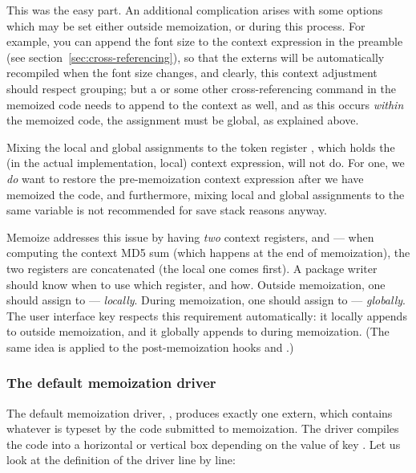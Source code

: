 \documentclass[a4paper,11pt]{article}
\begin{document}
This was the easy part.  An additional complication arises with some options
which may be set either outside memoization, or during this process.  For
example, you can append the font size to the context expression in the preamble
(see section~\ref{sec:cross-referencing}), so that the externs will be
automatically recompiled when the font size changes, and clearly, this context
adjustment should respect  grouping; but a  or some other
cross-referencing command in the memoized code needs to append to the context
as well, and as this  occurs \emph{within} the memoized code, the
assignment must be global, as explained above.

Mixing the local and global assignments to the token register
, which holds the (in the actual implementation, local)
context expression, will not do.  For one, we \emph{do} want to restore the
pre-memoization context expression after we have memoized the code, and
furthermore, mixing local and global assignments to the same variable is not
recommended for save stack reasons anyway.

Memoize addresses this issue by having \emph{two} context registers,
 and  --- when computing the context
MD5 sum (which happens at the end of memoization), the two registers are
concatenated (the local one comes first).  A package writer should know when to
use which register, and how.  Outside memoization, one should assign to
 --- \emph{locally}.  During memoization, one should assign
to  --- \emph{globally}.  The user interface key
 respects this requirement automatically: it locally appends to
 outside memoization, and it globally appends to
 during memoization. (The same idea is applied to the
post-memoization hooks  and .)


\subsubsection{The default memoization driver}
\label{sec:memoization-driver-default}

The default memoization driver, , produces
exactly one extern, which contains whatever is typeset by the code submitted to
memoization.  The driver compiles the code into a horizontal or vertical box
depending on the value of key .  Let us look at the definition
of the driver line by line:
\end{document}
